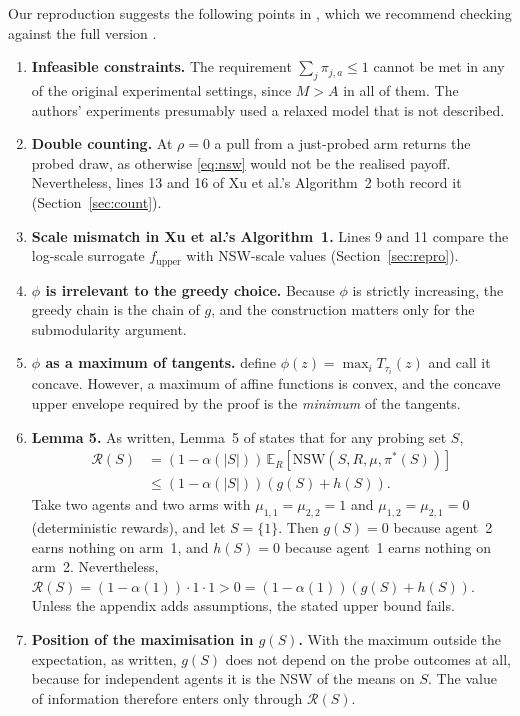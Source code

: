 \documentclass[letterpaper]{article}
\newcommand{\NSW}{\mathrm{NSW}}
\newcommand{\E}{\mathbb{E}}
\begin{document}
Our reproduction suggests the following points in \citet{xu2026fair}, which we
recommend checking against the full version \citep{xu2025fairarxiv}.
\begin{enumerate}
\item \textbf{Infeasible constraints.} The requirement $\sum_j\pi_{j,a}\le1$
      cannot be met in any of the original experimental settings, since $M>A$
      in all of them. The authors' experiments presumably used a relaxed model
      that is not described.
\item \textbf{Double counting.} At $\rho=0$ a pull from a just-probed arm
      returns the probed draw, as otherwise \eqref{eq:nsw} would not be the
      realised payoff. Nevertheless, lines 13 and 16 of Xu et al.'s Algorithm~2
      both record it (Section~\ref{sec:count}).
\item \textbf{Scale mismatch in Xu et al.'s Algorithm~1.} Lines 9 and 11 compare
      the log-scale surrogate $f_{\mathrm{upper}}$ with NSW-scale values
      (Section~\ref{sec:repro}).
\item \textbf{$\phi$ is irrelevant to the greedy choice.} Because $\phi$ is
      strictly increasing, the greedy chain is the chain of $g$, and the
      construction matters only for the submodularity argument.
\item \textbf{$\phi$ as a maximum of tangents.} \citet{xu2026fair} define
      $\phi(z)=\max_i T_{\tau_i}(z)$ and call it concave. However, a maximum of
      affine functions is convex, and the concave upper envelope required by
      the proof is the \emph{minimum} of the tangents.
\item \textbf{Lemma 5.} \label{lem:5}As written, Lemma~5 of
      \citet{xu2026fair} states that for any probing set $S$,
      \begin{align*}
        \mathcal{R}(S)&=(1-\alpha(|S|))\,\E_R[\NSW(S,R,\mu,\pi^\ast(S))]\\
        &\le(1-\alpha(|S|))(g(S)+h(S)).
      \end{align*}
      Take two agents and two arms with $\mu_{1,1}=\mu_{2,2}=1$ and
      $\mu_{1,2}=\mu_{2,1}=0$ (deterministic rewards), and let $S=\{1\}$. Then
      $g(S)=0$ because agent~2 earns nothing on arm~1, and $h(S)=0$ because
      agent~1 earns nothing on arm~2. Nevertheless,
      $\mathcal{R}(S)=(1-\alpha(1))\cdot1\cdot1>0=(1-\alpha(1))(g(S)+h(S))$.
      Unless the appendix adds assumptions, the stated upper bound fails.
\item \textbf{Position of the maximisation in $g(S)$.} With the maximum outside
      the expectation, as written, $g(S)$ does not depend on the probe outcomes
      at all, because for independent agents it is the NSW of the means on $S$.
      The value of information therefore enters only through $\mathcal{R}(S)$.
\end{enumerate}
\end{document}
